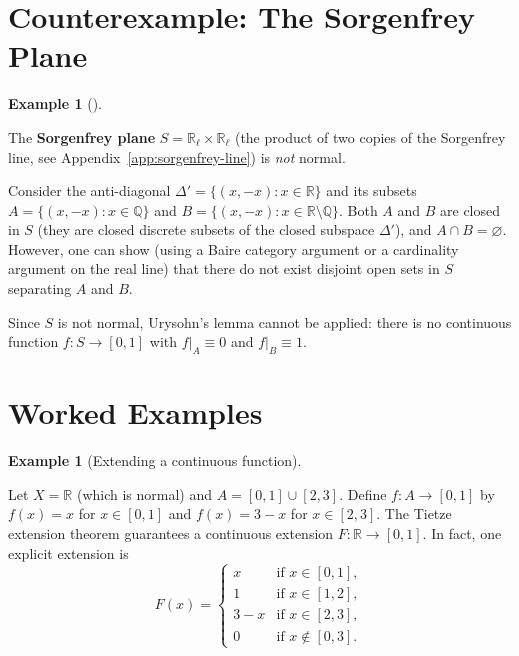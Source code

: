 \documentclass[11pt,a4paper,twoside]{book}
\theoremstyle{remark}
\theoremstyle{definition}
\newtheorem{exampleplain}[theorem]{Example}
\theoremstyle{definition}
\newenvironment{example}[1][]{%
  \begin{exampleplain}[#1]\itshape
}{%
  \end{exampleplain}
}
\begin{document}
\section{Counterexample: The Sorgenfrey Plane}
\label{sec:sorgenfrey-plane-not-normal}

\begin{example}
\label{ex:sorgenfrey-plane-not-normal}
The \textbf{Sorgenfrey plane} $S=\mathbb{R}_\ell
\times\mathbb{R}_\ell$ (the product of two copies of the Sorgenfrey
line, see Appendix~\ref{app:sorgenfrey-line}) is \emph{not} normal.

Consider the anti-diagonal $\Delta'=\{(x,-x):x\in\mathbb{R}\}$ and
its subsets $A=\{(x,-x):x\in\mathbb{Q}\}$ and
$B=\{(x,-x):x\in\mathbb{R}\setminus\mathbb{Q}\}$.  Both $A$ and $B$
are closed in $S$ (they are closed discrete subsets of the closed
subspace $\Delta'$), and $A\cap B=\varnothing$.  However, one can show
(using a Baire category argument or a cardinality argument on the
real line) that there do not exist disjoint open sets in $S$ separating
$A$ and $B$.

Since $S$ is not normal, Urysohn's lemma cannot be applied: there is
no continuous function $f\colon S\to[0,1]$ with $f|_A\equiv 0$ and
$f|_B\equiv 1$.
\end{example}

\section{Worked Examples}
\label{sec:urysohn-worked-examples}

\begin{example}[Extending a continuous function]
\label{ex:tietze-worked-1}
Let $X=\mathbb{R}$ (which is normal) and $A=[0,1]\cup[2,3]$.  Define
$f\colon A\to[0,1]$ by $f(x)=x$ for $x\in[0,1]$ and $f(x)=3-x$ for
$x\in[2,3]$.  The Tietze extension theorem guarantees a continuous
extension $F\colon\mathbb{R}\to[0,1]$.  In fact, one explicit extension
is
\[
  F(x) = \begin{cases}
    x     & \text{if }x\in[0,1],\\
    1     & \text{if }x\in[1,2],\\
    3-x   & \text{if }x\in[2,3],\\
    0     & \text{if }x\notin[0,3].
  \end{cases}
\]
\end{example}
\end{document}
